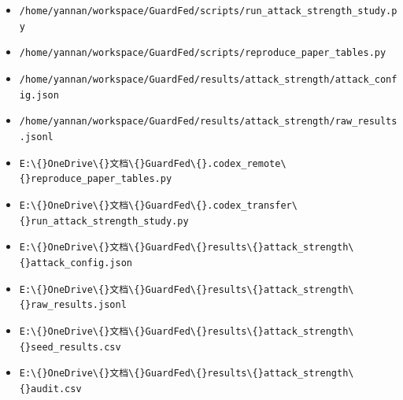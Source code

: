 \documentclass[UTF8,a4paper,10pt]{ctexart}
\begin{document}
\begin{itemize}
\item \texttt{/home/yannan/workspace/GuardFed/scripts/run\_attack\_strength\_study.py}
\item \texttt{/home/yannan/workspace/GuardFed/scripts/reproduce\_paper\_tables.py}
\item \texttt{/home/yannan/workspace/GuardFed/results/attack\_strength/attack\_config.json}
\item \texttt{/home/yannan/workspace/GuardFed/results/attack\_strength/raw\_results.jsonl}
\end{itemize}
\begin{itemize}
\item \texttt{E:\textbackslash\{\}OneDrive\textbackslash\{\}文档\textbackslash\{\}GuardFed\textbackslash\{\}.codex\_remote\textbackslash\{\}reproduce\_paper\_tables.py}
\item \texttt{E:\textbackslash\{\}OneDrive\textbackslash\{\}文档\textbackslash\{\}GuardFed\textbackslash\{\}.codex\_transfer\textbackslash\{\}run\_attack\_strength\_study.py}
\item \texttt{E:\textbackslash\{\}OneDrive\textbackslash\{\}文档\textbackslash\{\}GuardFed\textbackslash\{\}results\textbackslash\{\}attack\_strength\textbackslash\{\}attack\_config.json}
\item \texttt{E:\textbackslash\{\}OneDrive\textbackslash\{\}文档\textbackslash\{\}GuardFed\textbackslash\{\}results\textbackslash\{\}attack\_strength\textbackslash\{\}raw\_results.jsonl}
\item \texttt{E:\textbackslash\{\}OneDrive\textbackslash\{\}文档\textbackslash\{\}GuardFed\textbackslash\{\}results\textbackslash\{\}attack\_strength\textbackslash\{\}seed\_results.csv}
\item \texttt{E:\textbackslash\{\}OneDrive\textbackslash\{\}文档\textbackslash\{\}GuardFed\textbackslash\{\}results\textbackslash\{\}attack\_strength\textbackslash\{\}audit.csv}
\end{itemize}
\end{document}
